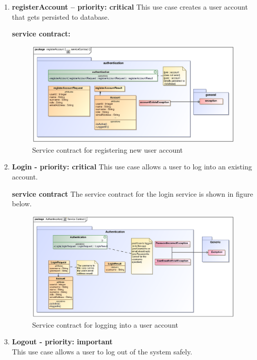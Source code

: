 \begin{enumerate}

\item \textbf{registerAccount  – priority: critical } 
This use case creates  a user account that gets persisted to database.

\textbf{service contract:}

\begin{figure}[h]
		\includegraphics[scale=0.9]{epsImages/Authentication/serviceContract.eps}
		\caption{Service contract for registering new user account}
\end{figure}

\newpage
\item \textbf{Login - priority: critical}
This use case allows a user to log into an existing account.

\par{\textbf{service contract} The service contract for the login service is shown in figure below.}
\begin{figure}[h]
		\includegraphics[scale=0.9]{epsImages/Authentication/LoginServiceContract.eps}
		\caption{Service contract for logging into a user account}
\end{figure}

\item \textbf{Logout - priority: important} \\
This use case allows a user to log out of the system safely. \\ \\


\end{enumerate}
